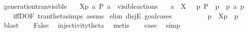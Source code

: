 \begin{isabellebody}
\endisatagproof
{\isafoldproof}%
%
\isadelimproof
\isanewline
%
\endisadelimproof
\isanewline
{}\isamarkupfalse%
\ generation{\isacharunderscore}{\kern0pt}tran{\isacharunderscore}{\kern0pt}visible{\isacharcolon}{\kern0pt}\isanewline
\ \ \ {\isacartoucheopen}{\isasymtheta}{\isacharbrackleft}{\kern0pt}X{\isacharbrackright}{\kern0pt}{\isacharparenleft}{\kern0pt}p{\isacharparenright}{\kern0pt}\ {\isasymlongmapsto}\isactrlsup {\isasymtheta}a\ P{\isacharprime}{\kern0pt}{\isacartoucheclose}\ {\isacartoucheopen}a\ {\isasymin}\ visible{\isacharunderscore}{\kern0pt}actions{\isacartoucheclose}\isanewline
\ \ \ {\isacartoucheopen}a\ {\isasymin}\ X\ {\isasymand}\ {\isacharparenleft}{\kern0pt}{\isasymexists}\ p{\isacharprime}{\kern0pt}{\isachardot}{\kern0pt}\ P{\isacharprime}{\kern0pt}\ {\isacharequal}{\kern0pt}\ {\isasymtheta}{\isacharparenleft}{\kern0pt}p{\isacharprime}{\kern0pt}{\isacharparenright}{\kern0pt}\ {\isasymand}\ p\ {\isasymlongmapsto}a\ p{\isacharprime}{\kern0pt}{\isacharparenright}{\kern0pt}{\isacartoucheclose}\isanewline
%
\isadelimproof
\ \ %
\endisadelimproof
%
\isatagproof
{}\isamarkupfalse%
\ iffD{}{\isacharbrackleft}{\kern0pt}OF\ tran{\isacharunderscore}{\kern0pt}theta{\isachardot}{\kern0pt}simps\ assms{\isacharparenleft}{\kern0pt}{}{\isacharparenright}{\kern0pt}{\isacharbrackright}{\kern0pt}\isanewline
{}\isamarkupfalse%
\ {\isacharparenleft}{\kern0pt}elim\ disjE{\isacharcomma}{\kern0pt}\ goal{\isacharunderscore}{\kern0pt}cases{\isacharparenright}{\kern0pt}\isanewline
\ \ \isamarkupfalse%
\ {}\isanewline
\ \ \isamarkupfalse%
\ \isamarkupfalse%
\ p{\isacharprime}{\kern0pt}\ \ {\isacartoucheopen}{\isasymtheta}{\isacharbrackleft}{\kern0pt}X{\isacharbrackright}{\kern0pt}{\isacharparenleft}{\kern0pt}p{\isacharparenright}{\kern0pt}\ {\isacharequal}{\kern0pt}\ {\isasymtheta}{\isacharparenleft}{\kern0pt}p{\isacharprime}{\kern0pt}{\isacharparenright}{\kern0pt}{\isacartoucheclose}\ \isamarkupfalse%
\ blast\isanewline
\ \ \isamarkupfalse%
\ False\ \isamarkupfalse%
\ injectivity{\isacharunderscore}{\kern0pt}theta{\isacharparenleft}{\kern0pt}{}{\isacharparenright}{\kern0pt}\ \isamarkupfalse%
\ metis\isanewline
\ \ \isamarkupfalse%
\ {\isacharquery}{\kern0pt}case\ \isamarkupfalse%
\ simp\isanewline
{}\isamarkupfalse%
\isanewline
\ \ \isamarkupfalse%

\end{isabellebody}

